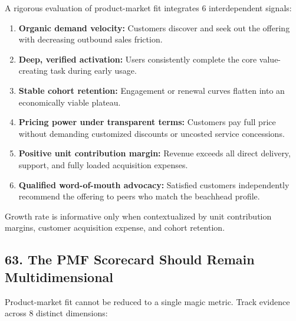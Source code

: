 A rigorous evaluation of product-market fit integrates 6 interdependent signals:
\begin{enumerate}
    \item \textbf{Organic demand velocity:} Customers discover and seek out the offering with decreasing outbound sales friction.
    \item \textbf{Deep, verified activation:} Users consistently complete the core value-creating task during early usage.
    \item \textbf{Stable cohort retention:} Engagement or renewal curves flatten into an economically viable plateau.
    \item \textbf{Pricing power under transparent terms:} Customers pay full price without demanding customized discounts or uncosted service concessions.
    \item \textbf{Positive unit contribution margin:} Revenue exceeds all direct delivery, support, and fully loaded acquisition expenses.
    \item \textbf{Qualified word-of-mouth advocacy:} Satisfied customers independently recommend the offering to peers who match the beachhead profile.
\end{enumerate}

Growth rate is informative only when contextualized by unit contribution margins, customer acquisition expense, and cohort retention.

\subsection*{63. The PMF Scorecard Should Remain Multidimensional}

Product-market fit cannot be reduced to a single magic metric. Track evidence across 8 distinct dimensions:

